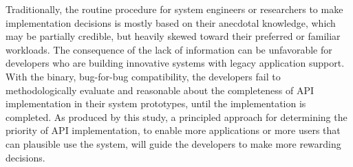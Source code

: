 
%

Traditionally,
the routine procedure for system engineers or researchers
to make implementation decisions
is mostly based on their anecdotal knowledge,
which may be partially credible, but heavily skewed toward their preferred or familiar workloads.
The consequence of the lack of information
can be unfavorable for developers who are building innovative systems with legacy application support.
With the binary, bug-for-bug compatibility,
the developers fail to methodologically evaluate and reasonable about
the completeness of API implementation
in their system prototypes,
until the implementation is completed.
As produced by this study,
a principled approach for determining the priority of API implementation,
to enable more applications or more users
that can plausible use the system,
will guide the developers to make more rewarding decisions.

